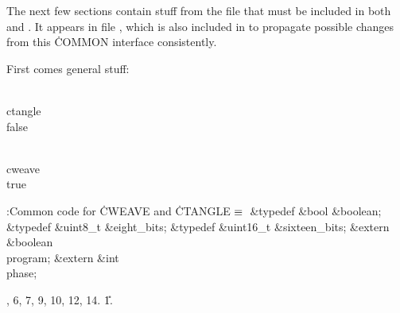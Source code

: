 The next few sections contain stuff from the file  that
must
be included in both  and . It appears in
file , which is also included in  to
propagate
possible changes from this \.{COMMON} interface consistently.








First comes general stuff:



\Y\B\4\D\\{ctangle}\5
\\{false}\par
\B\4\D\\{cweave}\5
\\{true}\par
\Y\B\4:Common code for \.{CWEAVE} and \.{CTANGLE}\X${}\equiv{}$\6
\&{typedef} \&{bool} \&{boolean};\6
\&{typedef} \&{uint8\_t} \&{eight\_bits};\6
\&{typedef} \&{uint16\_t} \&{sixteen\_bits};\6
\&{extern} \&{boolean} \\{program};\6
\&{extern} \&{int} \\{phase};\par
{}, 6, 7, 9, 10, 12, 14.
\U1.\fi

